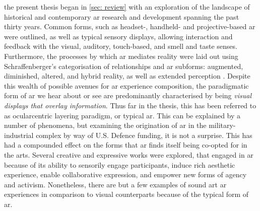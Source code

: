 \begin{itemize}
    \RQgenealogy
    \RQtheory
\end{itemize}

the present thesis began in \autoref{sec: review} with an exploration of the landscape of historical and contemporary \gls{ar} research and development spanning the past thirty years. Common forms, such as headset-, handheld- and projective-based \gls{ar} were outlined, as well as typical sensory displays, allowing interaction and feedback with the visual, auditory, touch-based, and smell and taste senses. Furthermore, the processes by which \gls{ar} mediates reality were laid out using Schraffenberger's categorisation of relationships and \gls{ar} subforms: augmented, diminished, altered, and hybrid reality, as well as extended perception \citep{schraffenberger2018}. Despite this wealth of possible avenues for \gls{ar} experience composition, the paradigmatic form of \gls{ar} we hear about or see are predominantly characterised by being \textit{visual displays that overlay information}. Thus far in the thesis, this has been referred to as ocularcentric layering paradigm, or typical \gls{ar}. This can be explained by a number of phenomena, but examining the origination of \gls{ar} in the military-industrial complex by way of U.S. Defence funding, it is not a surprise. This has had a compounded effect on the forms that \gls{ar} finds itself being co-opted for in the arts. Several creative and expressive works were explored, that engaged in \gls{ar} because of its ability to sensorily engage participants, induce rich aesthetic experience, enable collaborative expression, and empower new forms of agency and activism. Nonetheless, there are but a few examples of sound art \gls{ar} experiences in comparison to visual counterparts because of the typical form of \gls{ar}.

